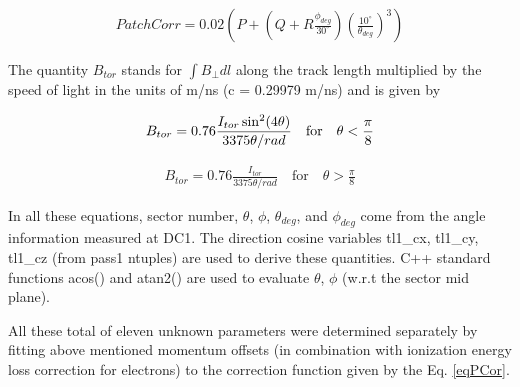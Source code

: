 \begin{eqnarray}
\label{eqPatchCor}
PatchCorr = 0.02\left(P + (Q + R\frac{\phi_{deg}}{30^\circ})(\frac{10^\circ}{\theta_{deg}})^3 \right) 
\end{eqnarray}


The quantity $B_{tor}$ stands for $\int{B_{\perp}dl}$ along the track length multiplied by the speed of light in the units 
of m/ns (c = 0.29979 m/ns) and is given by

\begin{eqnarray}
\label{eqBtor1}
B_{tor} = 0.76 \frac{I_{tor}\sin^2(4\theta)}{3375\theta/rad} \quad  \rm{for} \quad  \theta < \frac{\pi}{8} %
\end{eqnarray}

\begin{eqnarray}
\label{eqBtor2}
B_{tor} = 0.76 \frac{I_{tor}}{3375\theta/rad}  \quad  \textrm{for}  \quad  \theta > \frac{\pi}{8}
\end{eqnarray}

In all these equations, sector number, $\theta$, $\phi$, $\theta_{deg}$, and $\phi_{deg}$ come from the angle information measured at DC1. The direction cosine variables tl1\_cx, tl1\_cy, tl1\_cz (from pass1 ntuples) are used to derive these quantities. C++ standard functions acos() and atan2() are used to evaluate $\theta$, $\phi$ (w.r.t the sector mid plane). %



All these total of eleven unknown parameters were determined separately by fitting above mentioned momentum offsets (in combination with ionization energy loss correction for electrons) to the correction function given by the Eq. \ref{eqPCor}.





